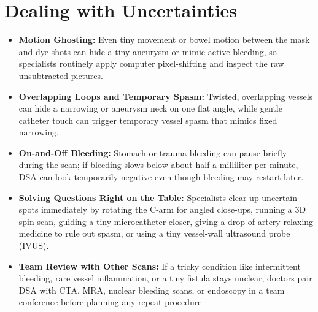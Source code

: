 \section{Dealing with Uncertainties}
\begin{itemize}
\item \textbf{Motion Ghosting:} Even tiny movement or bowel motion between the mask and dye shots can hide a tiny aneurysm or mimic active bleeding, so specialists routinely apply computer pixel-shifting and inspect the raw unsubtracted pictures.
\item \textbf{Overlapping Loops and Temporary Spasm:} Twisted, overlapping vessels can hide a narrowing or aneurysm neck on one flat angle, while gentle catheter touch can trigger temporary vessel spasm that mimics fixed narrowing.
\item \textbf{On-and-Off Bleeding:} Stomach or trauma bleeding can pause briefly during the scan; if bleeding slows below about half a milliliter per minute, DSA can look temporarily negative even though bleeding may restart later.
\item \textbf{Solving Questions Right on the Table:} Specialists clear up uncertain spots immediately by rotating the C-arm for angled close-ups, running a 3D spin scan, guiding a tiny microcatheter closer, giving a drop of artery-relaxing medicine to rule out spasm, or using a tiny vessel-wall ultrasound probe (IVUS).
\item \textbf{Team Review with Other Scans:} If a tricky condition like intermittent bleeding, rare vessel inflammation, or a tiny fistula stays unclear, doctors pair DSA with CTA, MRA, nuclear bleeding scans, or endoscopy in a team conference before planning any repeat procedure.
\end{itemize}

